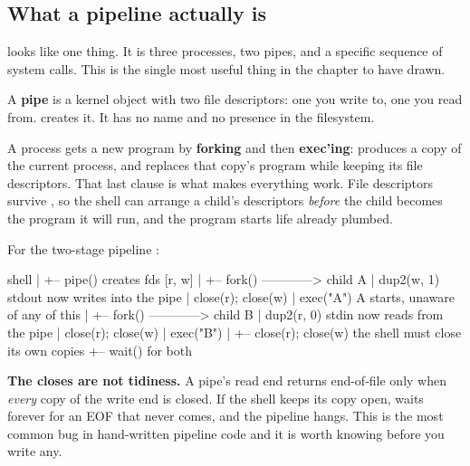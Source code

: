 
\subsection{What a pipeline actually is}
\label{c2:app:a2}

 looks like one thing. It is three processes, two pipes, and a specific
sequence of system calls. This is the single most useful thing in the chapter to have drawn.

A \textbf{pipe} is a kernel object with two file descriptors: one you write to, one you read from.
 creates it. It has no name and no presence in the filesystem.

A process gets a new program by \textbf{forking} and then \textbf{exec'ing}:  produces
a copy of the current process, and  replaces that copy's program while keeping its file
descriptors. That last clause is what makes everything work. File descriptors survive ,
so the shell can arrange a child's descriptors \emph{before} the child becomes the program it will
run, and the program starts life already plumbed.

For the two-stage pipeline :

\begin{console}
  shell
    |
    +-- pipe()             creates fds [r, w]
    |
    +-- fork() ------------> child A
    |                          dup2(w, 1)      stdout now writes into the pipe
    |                          close(r); close(w)
    |                          exec("A")       A starts, unaware of any of this
    |
    +-- fork() ------------> child B
    |                          dup2(r, 0)      stdin now reads from the pipe
    |                          close(r); close(w)
    |                          exec("B")
    |
    +-- close(r); close(w)   the shell must close its own copies
    +-- wait() for both
\end{console}

\noindent \textbf{The closes are not tidiness.} A pipe's read end returns end-of-file only when
\emph{every} copy of the write end is closed. If the shell keeps its copy open,  waits
forever for an EOF that never comes, and the pipeline hangs. This is the most common bug in
hand-written pipeline code and it is worth knowing before you write any.

